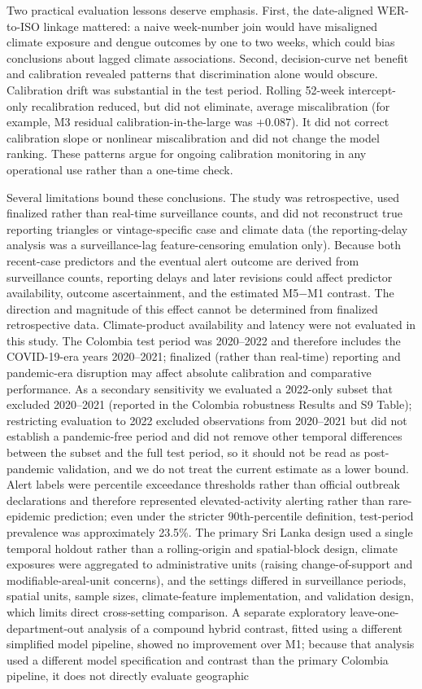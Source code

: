 \documentclass[11pt,a4paper]{article}
\begin{document}
Two practical evaluation lessons deserve emphasis. First, the date-aligned WER-to-ISO linkage mattered: a naive week-number join would have misaligned climate exposure and dengue outcomes by one to two weeks, which could bias conclusions about lagged climate associations. Second, decision-curve net benefit and calibration revealed patterns that discrimination alone would obscure. Calibration drift was substantial in the test period. Rolling 52-week intercept-only recalibration reduced, but did not eliminate, average miscalibration (for example, M3 residual calibration-in-the-large was $+0.087$). It did not correct calibration slope or nonlinear miscalibration and did not change the model ranking. These patterns argue for ongoing calibration monitoring in any operational use rather than a one-time check.

Several limitations bound these conclusions. The study was retrospective, used finalized rather than real-time surveillance counts, and did not reconstruct true reporting triangles or vintage-specific case and climate data (the reporting-delay analysis was a surveillance-lag feature-censoring emulation only). Because both recent-case predictors and the eventual alert outcome are derived from surveillance counts, reporting delays and later revisions could affect predictor availability, outcome ascertainment, and the estimated M5$-$M1 contrast. The direction and magnitude of this effect cannot be determined from finalized retrospective data. Climate-product availability and latency were not evaluated in this study. The Colombia test period was 2020--2022 and therefore includes the COVID-19-era years 2020--2021; finalized (rather than real-time) reporting and pandemic-era disruption may affect absolute calibration and comparative performance. As a secondary sensitivity we evaluated a 2022-only subset that excluded 2020--2021 (reported in the Colombia robustness Results and S9 Table); restricting evaluation to 2022 excluded observations from 2020--2021 but did not establish a pandemic-free period and did not remove other temporal differences between the subset and the full test period, so it should not be read as post-pandemic validation, and we do not treat the current estimate as a lower bound. Alert labels were percentile exceedance thresholds rather than official outbreak declarations and therefore represented elevated-activity alerting rather than rare-epidemic prediction; even under the stricter 90th-percentile definition, test-period prevalence was approximately 23.5\%. The primary Sri Lanka design used a single temporal holdout rather than a rolling-origin and spatial-block design, climate exposures were aggregated to administrative units (raising change-of-support and modifiable-areal-unit concerns), and the settings differed in surveillance periods, spatial units, sample sizes, climate-feature implementation, and validation design, which limits direct cross-setting comparison. A separate exploratory leave-one-department-out analysis of a compound hybrid contrast, fitted using a different simplified model pipeline, showed no improvement over M1; because that analysis used a different model specification and contrast than the primary Colombia pipeline, it does not directly evaluate geographic 
\end{document}
